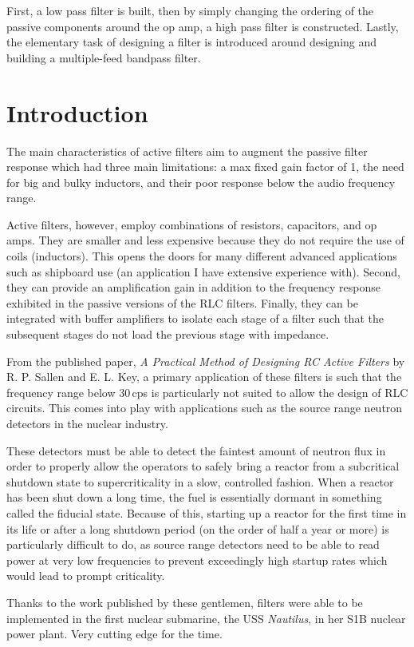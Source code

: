 \documentclass[12pt]{article}
\begin{document}
First, a low pass filter is built, then by simply changing the ordering of the
passive components around the op amp, a high pass filter is constructed. Lastly,
the elementary task of designing a filter is introduced around designing and
building a multiple-feed bandpass filter.

\newpage
\section{Introduction}
The main characteristics of active filters aim to augment the passive filter
response which had three main limitations: a max fixed gain factor of 1, the
need for big and bulky inductors, and their poor response below the audio
frequency range.

Active filters, however, employ combinations of resistors,
capacitors, and op amps. They are smaller and less expensive because they do not
require the use of coils (inductors). This opens the doors for many different
advanced applications such as shipboard use (an application I have extensive
experience with). Second, they can provide an amplification gain in addition to
the frequency response exhibited in the passive versions of the RLC filters.
Finally, they can be integrated with buffer amplifiers to isolate each stage of
a filter such that the subsequent stages do not load the previous stage with
impedance.

From the published paper, \emph{A Practical Method of Designing RC Active
	Filters} by R. P. Sallen and E. L. Key, a primary application of these filters
is such that the frequency range below $30$\,cps is particularly not suited to
allow the design of RLC circuits. This comes into play with applications such as
the source range neutron detectors in the nuclear industry.

These detectors must be able to detect the faintest amount of neutron flux in
order to properly allow the operators to safely bring a reactor from a
subcritical shutdown state to supercriticality in a slow, controlled fashion.
When a reactor has been shut down a long time, the fuel is essentially dormant
in something called the fiducial state. Because of this, starting up a reactor
for the first time in its life or after a long shutdown period (on the order of
half a year or more) is particularly difficult to do, as source range detectors
need to be able to read power at very low frequencies to prevent exceedingly
high startup rates which would lead to prompt criticality.

Thanks to the work published by these gentlemen, filters were able to be
implemented in the first nuclear submarine, the USS \emph{Nautilus}, in her S1B
nuclear power plant. Very cutting edge for the time.
\end{document}
